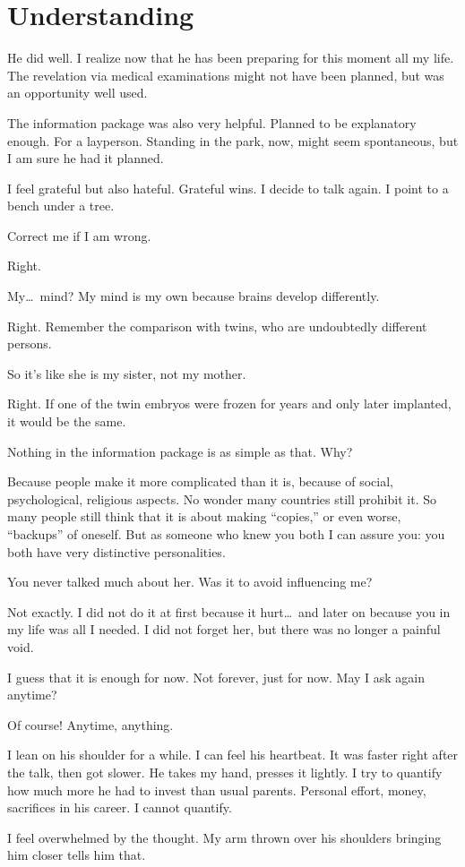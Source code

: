 \chapter*{Understanding}\label{understanding}

He did well. I realize now that he has been preparing for this moment all my life. The revelation via medical examinations might not have been planned, but was an opportunity well used.

The information package was also very helpful. Planned to be explanatory enough. For a layperson. Standing in the park, now, might seem spontaneous, but I am sure he had it planned.

I feel grateful but also hateful. Grateful wins. I decide to talk again. I point to a bench under a tree. 

Correct me if I am wrong.

Right.

My\dots~mind? My mind is my own because brains develop differently.

Right. Remember the comparison with twins, who are undoubtedly different persons. 

So it's like she is my sister, not my mother.

Right. If one of the twin embryos were frozen for years and only later implanted, it would be the same.

Nothing in the information package is as simple as that. Why?

Because people make it more complicated than it is, because of social, psychological, religious aspects. No wonder many countries still prohibit it. So many people still think that it is about making \enquote{copies,} or even worse, \enquote{backups} of oneself. But as someone who knew you both I can assure you: you both have very distinctive personalities.

You never talked much about her. Was it to avoid influencing me?

Not exactly. I did not do it at first because it hurt\dots~and later on because you in my life was all I needed. I did not forget her, but there was no longer a painful void.

I guess that it is enough for now. Not forever, just for now. May I ask again anytime?

Of course! Anytime, anything.

I lean on his shoulder for a while. I can feel his heartbeat. It was faster right after the talk, then got slower. He takes my hand, presses it lightly. I try to quantify how much more he had to invest than usual parents. Personal effort, money, sacrifices in his career. I cannot quantify.

I feel overwhelmed by the thought. My arm thrown over his shoulders bringing him closer tells him that.  